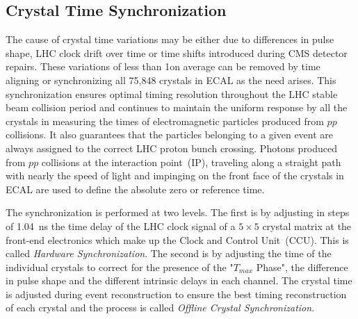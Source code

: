 \subsection{Crystal Time Synchronization}
The cause of crystal time variations may be either due to differences in pulse shape, LHC clock drift over time or time shifts introduced during CMS detector repairs. These variations of less than 1\ns on average can be removed by time aligning or synchronizing all 75,848 \pb crystals in ECAL as the need arises. This synchronization ensures optimal timing resolution throughout the LHC stable beam collision period and continues to maintain the uniform response by all the crystals in measuring the times of electromagnetic particles produced from $pp$ collisions. It also guarantees that the particles  belonging to a given event are always assigned to the correct LHC proton bunch crossing. 
\newline
Photons produced from $pp$ collisions at the interaction point~(IP), traveling along a straight path with nearly the speed of light and impinging on the front face of the crystals in ECAL are used to define the absolute zero or reference time. 
\par 
The synchronization is performed at two levels. The first is by adjusting in steps of 1.04~ns the time delay of the LHC clock signal of a $5\times5$ crystal matrix at the front-end electronics which make up the Clock and Control Unit~(CCU). This is called \textit{Hardware Synchronization}. The second is by adjusting the time of the individual crystals to correct for the presence of the "$T_{max}$ Phase", the difference in pulse shape and the different intrinsic delays in each channel. The crystal time is adjusted during event reconstruction to ensure the best timing reconstruction of each crystal and the process is called \textit{Offline Crystal Synchronization}.
